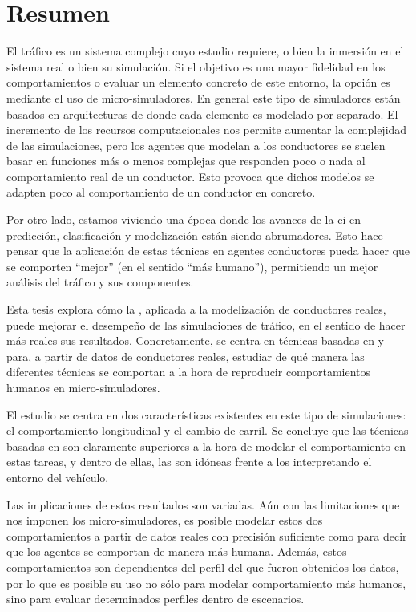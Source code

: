 \cleardoublepage
\thispagestyle{empty}
\chapter*{Resumen}
\begin{fullwidth}
	El tráfico es un sistema complejo cuyo estudio requiere, o bien la inmersión en el sistema real o bien su simulación. Si el objetivo es una mayor fidelidad en los comportamientos o evaluar un elemento concreto de este entorno, la opción es mediante el uso de micro-simuladores. En general este tipo de simuladores están basados en arquitecturas de  donde cada elemento es modelado por separado. El incremento de los recursos computacionales nos permite aumentar la complejidad de las simulaciones, pero los agentes que modelan a los conductores se suelen basar en funciones más o menos complejas que responden poco o nada al comportamiento real de un conductor. Esto provoca que dichos modelos se adapten poco al comportamiento de un conductor en concreto.
	
	Por otro lado, estamos viviendo una época donde los avances de la \Acrfull{ci} en predicción, clasificación y modelización están siendo abrumadores. Esto hace pensar que la aplicación de estas técnicas en agentes conductores pueda hacer que se comporten \enquote{mejor} (en el sentido \enquote{más humano}), permitiendo un mejor análisis del tráfico y sus componentes.
	
	Esta tesis explora cómo la , aplicada a la modelización de conductores reales, puede mejorar el desempeño de las simulaciones de tráfico, en el sentido de hacer más reales sus resultados. Concretamente, se centra en técnicas basadas en  y  para, a partir de datos de conductores reales, estudiar de qué manera las diferentes técnicas se comportan a la hora de reproducir comportamientos humanos en micro-simuladores.
	
	El estudio se centra en dos características existentes en este tipo de simulaciones: el comportamiento longitudinal y el cambio de carril. Se concluye que las técnicas basadas en  son claramente superiores a la hora de modelar el comportamiento en estas tareas, y dentro de ellas, las  son idóneas frente a los  interpretando el entorno del vehículo.
	
	Las implicaciones de estos resultados son variadas. Aún con las limitaciones que nos imponen los micro-simuladores, es posible modelar estos dos comportamientos a partir de datos reales con precisión suficiente como para decir que los agentes se comportan de manera más humana. Además, estos comportamientos son dependientes del perfil del que fueron obtenidos los datos, por lo que es posible su uso no sólo para modelar comportamiento más humanos, sino para evaluar determinados perfiles dentro de escenarios.
	

\end{fullwidth}
